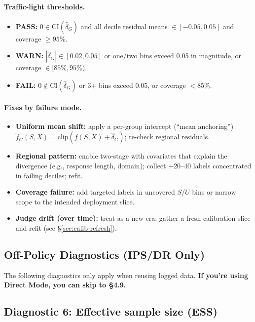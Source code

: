 \paragraph{Traffic-light thresholds.}
\begin{itemize}
\item \textbf{PASS:} $0 \in \text{CI}(\hat\delta_G)$ and all decile residual means $\in [-0.05,0.05]$ and coverage $\ge 95\%$.
\item \textbf{WARN:} $|\hat\delta_G| \in [0.02,0.05]$ or one/two bins exceed 0.05 in magnitude, or coverage $\in [85\%,95\%)$.
\item \textbf{FAIL:} $0 \notin \text{CI}(\hat\delta_G)$ or 3+ bins exceed 0.05, or coverage $<85\%$.
\end{itemize}

\paragraph{Fixes by failure mode.}
\begin{itemize}
\item \textbf{Uniform mean shift:} apply a per-group intercept (``mean anchoring'') $\tilde f_G(S,X)=\mathrm{clip}(f(S,X)+\hat\delta_G)$; re-check regional residuals.
\item \textbf{Regional pattern:} enable two-stage \autocal{} with covariates that explain the divergence (e.g., response length, domain); collect +20--40 labels concentrated in failing deciles; refit.
\item \textbf{Coverage failure:} add targeted labels in uncovered $S$/$U$ bins or narrow scope to the intended deployment slice.
\item \textbf{Judge drift (over time):} treat as a new era; gather a fresh calibration slice and refit (see \S\ref{sec:calib-refresh}).
\end{itemize}

\subsection*{Off-Policy Diagnostics (IPS/DR Only)}

The following diagnostics only apply when reusing logged data. \textbf{If you're using Direct Mode, you can skip to §4.9.}

\subsection{Diagnostic 6: Effective sample size (ESS)}

